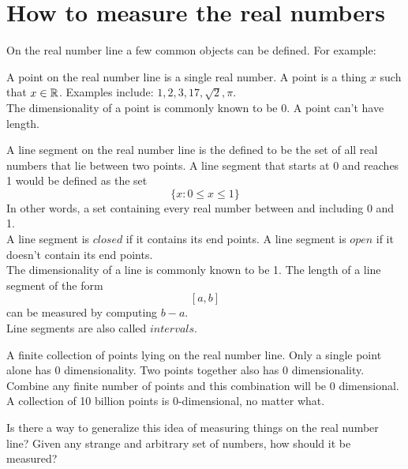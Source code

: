 \documentclass[11pt]{ekblite}
\begin{document}
\section{How to measure the real numbers}
On the real number line a few common objects can be defined. For example:
\begin{example}[Point]
	A point on the real number line is a single real number. A point is a thing $x$ such that $x \in \mathbb{R}$. Examples include: $1,2,3,17,\sqrt{2},\pi$.
	\\[0.2in]The dimensionality of a point is commonly known to be 0. A point can't have length.
\end{example}
\begin{example}
	A line segment on the real number line is the defined to be the set of all real numbers that lie between two points. A line segment that starts at 0 and reaches 1 would be defined as the set
	\[\{x : 0 \le x \le 1\}\] 
	In other words, a set containing every real number between and including 0 and 1.
	\\[0.2in]A line segment is $\textit{closed}$ if it contains its end points. A line segment is $\textit{open}$ if it doesn't contain its end points.
	\\[0.2in]The dimensionality of a line is commonly known to be 1. The length of a line segment of the form 
	\[[a,b]\]
	can be measured by computing $b - a$.  
	\\[0.2in]Line segments are also called $\textit{intervals}$.
\end{example}
\begin{example}
	A finite collection of points lying on the real number line. Only a single point alone has 0 dimensionality. Two points together also has 0 dimensionality. Combine any finite number of points and this combination will be 0 dimensional. A collection of 10 billion points is 0-dimensional, no matter what.
\end{example}
Is there a way to generalize this idea of measuring things on the real number line? Given any strange and arbitrary set of numbers, how should it be measured?
\end{document}
